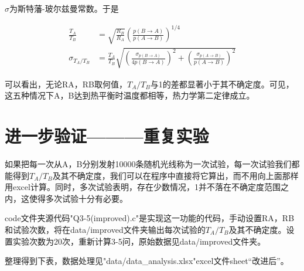 \documentclass[10pt, a4paper]{article}
\begin{document}
    $\sigma$为斯特藩-玻尔兹曼常数。于是

    \begin{align*}
        \frac{T_A}{T_B}&=\sqrt{\frac{R_B}{R_A}}(\frac{p(B\to A)}{p(A\to B)})^{1/4}\\
        \sigma_{{T_A}/{T_B}}&=\frac{T_A}{T_B}\sqrt{(\frac{\sigma_{p(B\to A)}}{4p(B\to A)})^2+(\frac{\sigma_{p(A\to B)}}{p(A\to B)})^2}
    \end{align*}

    可以看出，无论RA，RB取何值，$T_A/T_B$与1的差都显著小于其不确定度。可见，这五种情况下A，B达到热平衡时温度都相等，热力学第二定律成立。

    \section{进一步验证———重复实验}

    如果把每一次从A，B分别发射10000条随机光线称为一次试验，每一次试验我们都能得到$T_A/T_B$及其不确定度，我们可以在程序中直接将它算出，而不用向上面那样用excel计算。同时，多次试验表明，存在少数情况，1并不落在不确定度范围之内，这使得多次试验十分有必要。

    code文件夹源代码"Q3-5(improved).c"是实现这一功能的代码，手动设置RA，RB和试验次数，将在data/improved文件夹输出每次试验的$T_A/T_B$及其不确定度。设置实验次数为20次，重新计算3-5问，原始数据见data/improved文件夹。
    
    整理得到下表，数据处理见"data/data_analysis.xlsx"excel文件sheet“改进后”。
\end{document}
